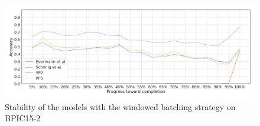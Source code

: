 \begin{figure}[!htb]
    \centering
    \includegraphics[width=\textwidth]{gfx/bpic2015_2/windowed_stability.png}
    \caption{Stability of the models with the windowed batching strategy on BPIC15-2}
    \label{fig:bpic15-2-windowed-stability}
\end{figure}

\FloatBarrier
